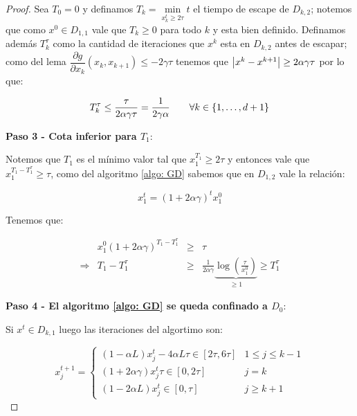 \begin{proof}
	Sea $T_0 = 0$ y definamos $T_k = \min\limits_{x^t_k \geq 2\tau} t$ el tiempo de escape de $D_{k,2}$; notemos que como $x^0 \in D_{1,1}$ vale que $T_k \geq 0$ para todo $k$ y esta bien definido. Definamos adem\'as $T_k^{\tau}$ como la cantidad de iteraciones que $x^k$ esta en $D_{k,2}$ antes de escapar; como del lema $\dfrac{\partial g}{\partial x_k}\left(x_k, x_{k+1}\right) \leq -2\gamma \tau$ tenemos que $\left\lvert x^k - x^{k+1}\right\rvert \geq 2 \alpha \gamma \tau $ por lo que:
	
	\begin{equation*}
		T_k^{\tau} \leq \frac{\tau}{2 \alpha \gamma \tau} = \frac{1}{2 \gamma \alpha} \qquad \forall k \in \left\lbrace1, \dots, d+1\right\rbrace
	\end{equation*}
	
	\medskip
	
	\textbf{Paso 3 - Cota inferior para $T_1$}:
	
	\medskip
	
	Notemos que $T_1$ es el m\'inimo valor tal que $x^{T_1}_1 \geq 2\tau$ y entonces vale que $x_1^{T_1 - T_1^{\tau}} \geq \tau$, como del algoritmo \ref{algo: GD} sabemos que en $D_{1,2}$ vale la relaci\'on:
	
	\begin{equation*}
	x_1^{t} = \left(1 + 2 \alpha \gamma\right)^t x_1^0
	\end{equation*}
	
	Tenemos que:
	
	\begin{equation*}
	\begin{array}{crcl}
	& x_1^0 \left(1 + 2 \alpha \gamma \right)^{T_1 - T_1^{\tau}} & \geq & \tau \\
	\Longrightarrow & T_1 - T_1^{\tau} & \geq & \frac{1}{2 \alpha \gamma} \underbrace{\log\left(\frac{\tau}{x_1^0}\right)}_{\geq 1}  \geq T_1^{\tau}
	\end{array}
	\end{equation*}
	
	\medskip
	
	\textbf{Paso 4 - El algoritmo \ref{algo: GD} se queda confinado a $D_0$}:
	
	\medskip
	
	Si $x^t \in D_{k,1}$ luego las iteraciones del algortimo son:
	
	\begin{equation*}
		x_j^{t+1} = \left\lbrace \begin{array}{cr}
		\left(1 - \alpha L\right)x_j^t - 4\alpha L \tau \in [2\tau, 6\tau] & 1 \leq j \leq k-1 \\
		\left(1 + 2\alpha \gamma \right)x_j^t \tau \in [0, 2\tau] & j = k \\
		\left(1 - 2\alpha L\right)x_j^t \in [0, \tau] & j \geq k+1 
		\end{array}\right.
	\end{equation*}
	

\end{proof}
